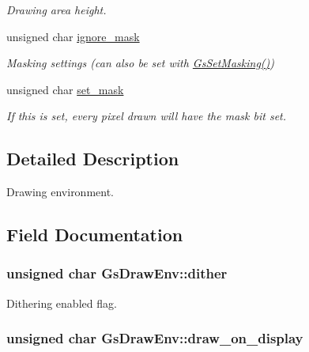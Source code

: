 \begin{DoxyCompactItemize}
\begin{DoxyCompactList}\small\item\em Drawing area height. \end{DoxyCompactList}\item 
unsigned char \hyperlink{structGsDrawEnv_a4702f6a0dc9e014fffc7c83a5d94dda2}{ignore\+\_\+mask}
\begin{DoxyCompactList}\small\item\em Masking settings (can also be set with \hyperlink{psxgpu_8h_a3227c6006b054de313ff717ee00d8314}{Gs\+Set\+Masking()}) \end{DoxyCompactList}\item 
unsigned char \hyperlink{structGsDrawEnv_a9c7f33c1da333d45f478dc9eb77bf0a1}{set\+\_\+mask}
\begin{DoxyCompactList}\small\item\em If this is set, every pixel drawn will have the mask bit set. \end{DoxyCompactList}\end{DoxyCompactItemize}


\subsection{Detailed Description}
Drawing environment. 

\subsection{Field Documentation}
\hypertarget{structGsDrawEnv_aaaed8f80f352d5e88563072418176aa3}{}
\subsubsection[{dither}]{\setlength{\rightskip}{0pt plus 5cm}unsigned char Gs\+Draw\+Env\+::dither}\label{structGsDrawEnv_aaaed8f80f352d5e88563072418176aa3}


Dithering enabled flag. 

\hypertarget{structGsDrawEnv_a308c7cb65b6076160c23905b2946fcfe}{}
\subsubsection[{draw\+\_\+on\+\_\+display}]{\setlength{\rightskip}{0pt plus 5cm}unsigned char Gs\+Draw\+Env\+::draw\+\_\+on\+\_\+display}\label{structGsDrawEnv_a308c7cb65b6076160c23905b2946fcfe}


